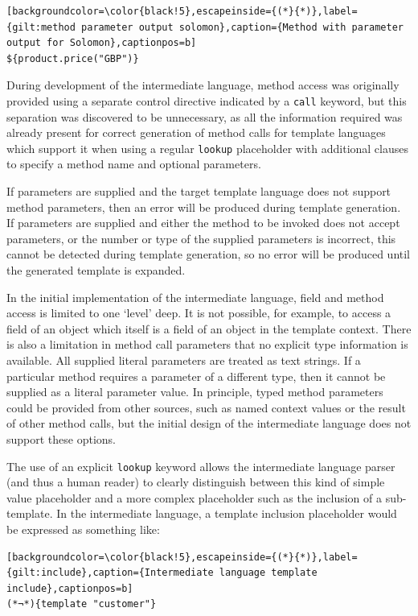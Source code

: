 \begin{lstlisting}[backgroundcolor=\color{black!5},escapeinside={(*}{*)},label={gilt:method parameter output solomon},caption={Method with parameter output for Solomon},captionpos=b]
${product.price("GBP")}
\end{lstlisting}

During development of the intermediate language, method access was originally provided using a separate control directive indicated by a \verb!call! keyword, but this separation was discovered to be unnecessary, as all the information required was already present for correct generation of method calls for template languages which support it when using a regular \verb!lookup! placeholder with additional clauses to specify a method name and optional parameters.

If parameters are supplied and the target template language does not support method parameters, then an error will be produced during template generation. If parameters are supplied and either the method to be invoked does not accept parameters, or the number or type of the supplied parameters is incorrect, this cannot be detected during template generation, so no error will be produced until the generated template is expanded.

In the initial implementation of the intermediate language, field and method access is limited to one `level' deep. It is not possible, for example, to access a field of an object which itself is a field of an object in the template context. There is also a limitation in method call parameters that no explicit type information is available. All supplied literal parameters are treated as text strings. If a particular method requires a parameter of a different type, then it cannot be supplied as a literal parameter value. In principle, typed method parameters could be provided from other sources, such as named context values or the result of other method calls, but the initial design of the intermediate language does not support these options.

The use of an explicit \verb!lookup! keyword allows the intermediate language parser (and thus a human reader) to clearly distinguish between this kind of simple value placeholder and a more complex placeholder such as the inclusion of a sub-template. In the intermediate language, a template inclusion placeholder would be expressed as something like:

\begin{lstlisting}[backgroundcolor=\color{black!5},escapeinside={(*}{*)},label={gilt:include},caption={Intermediate language template include},captionpos=b]
(*¬*){template "customer"}
\end{lstlisting}

